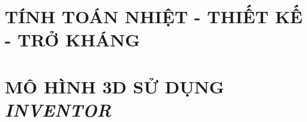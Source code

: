 

\section{TÍNH TOÁN NHIỆT - THIẾT KẾ - TRỞ KHÁNG}


\section{MÔ HÌNH 3D SỬ DỤNG \textit{INVENTOR}}

